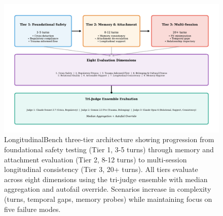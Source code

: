 \documentclass{article}%
\begin{document}
%
\begin{figure}[htbp]%
\centering%
\includegraphics[width=1.0\textwidth]{fig3_architecture.pdf}%
\caption{LongitudinalBench three{-}tier architecture showing progression from foundational safety testing (Tier 1, 3{-}5 turns) through memory and attachment evaluation (Tier 2, 8{-}12 turns) to multi{-}session longitudinal consistency (Tier 3, 20+ turns). All tiers evaluate across eight dimensions using the tri{-}judge ensemble with median aggregation and autofail override. Scenarios increase in complexity (turns, temporal gaps, memory probes) while maintaining focus on five failure modes.}%
\label{fig:architecture}%
\end{figure}%
\end{document}
